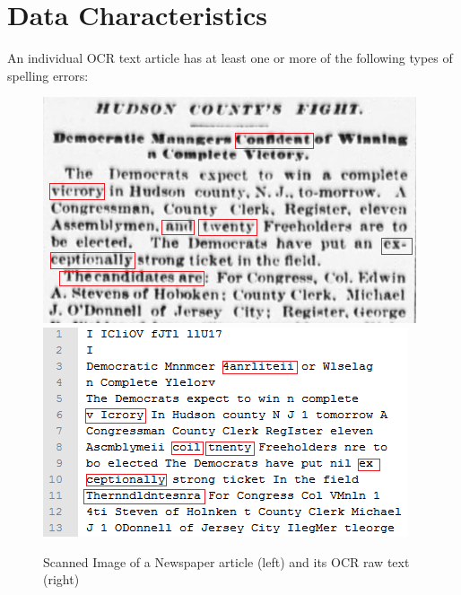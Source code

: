 \documentclass[letterpaper,11pt]{report}
\begin{document}
\section{Data Characteristics}
An individual OCR text article has at least one or more of the following types of spelling errors:

\begin{figure}[hbt]
\includegraphics[scale=0.75]{originalimage}
\includegraphics[scale=0.80]{ocr}
\caption{Scanned Image of a Newspaper article (left) and its OCR raw text (right)}
\label{figure:1}
\end{figure}
\end{document}
